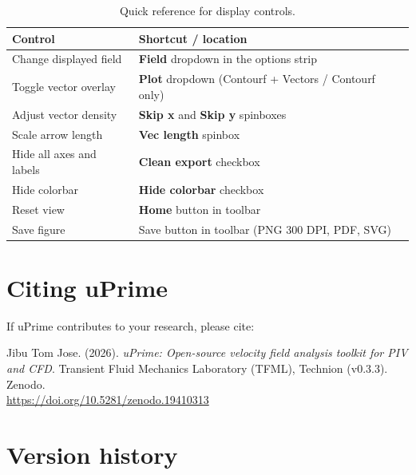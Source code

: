 \documentclass[11pt, a4paper]{report}
\newcommand{\uipth}[1]{\textbf{\textcolor{upblue}{#1}}}
\begin{document}
\begin{table}[htbp]
\centering
\caption{Quick reference for display controls.}
\begin{tabular}{ll}
\toprule
\textbf{Control} & \textbf{Shortcut / location} \\
\midrule
Change displayed field     & \uipth{Field} dropdown in the options strip \\
Toggle vector overlay      & \uipth{Plot} dropdown (Contourf + Vectors / Contourf only) \\
Adjust vector density      & \uipth{Skip x} and \uipth{Skip y} spinboxes \\
Scale arrow length         & \uipth{Vec length} spinbox \\
Hide all axes and labels   & \uipth{Clean export} checkbox \\
Hide colorbar              & \uipth{Hide colorbar} checkbox \\
Reset view                 & \uipth{Home} button in toolbar \\
Save figure                & Save button in toolbar (PNG 300 DPI, PDF, SVG) \\
\bottomrule
\end{tabular}
\end{table}

\appendix

\chapter{Citing uPrime}

If uPrime contributes to your research, please cite:

\begin{mdframed}[backgroundcolor=uplightgray, linecolor=upboxborder, linewidth=1pt]
Jibu Tom Jose. (2026). \textit{uPrime: Open-source velocity field analysis toolkit for PIV and CFD}. Transient Fluid Mechanics Laboratory (TFML), Technion (v0.3.3). Zenodo.\\
\url{https://doi.org/10.5281/zenodo.19410313}
\end{mdframed}

\chapter{Version history}
\end{document}
